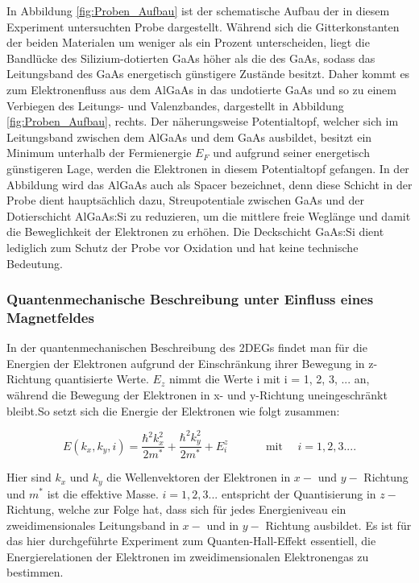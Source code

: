 In Abbildung \ref{fig:Proben_Aufbau} ist der schematische Aufbau der in diesem Experiment untersuchten Probe dargestellt. 
Während sich die Gitterkonstanten der beiden Materialen um weniger als ein Prozent unterscheiden, liegt die Bandlücke des  Silizium-dotierten GaAs  höher als die des GaAs, sodass das Leitungsband des GaAs energetisch günstigere Zustände besitzt. Daher kommt es zum Elektronenfluss aus dem AlGaAs in das undotierte GaAs und so zu einem Verbiegen des Leitungs- und Valenzbandes, dargestellt in Abbildung \ref{fig:Proben_Aufbau}, rechts.
Der näherungsweise Potentialtopf, welcher sich im Leitungsband zwischen dem AlGaAs und dem GaAs ausbildet, besitzt ein Minimum unterhalb der Fermienergie $E_F$ und aufgrund seiner energetisch günstigeren Lage, werden die Elektronen in diesem Potentialtopf gefangen. 
In der Abbildung wird das AlGaAs auch als Spacer bezeichnet, denn diese Schicht in der Probe dient hauptsächlich dazu, Streupotentiale zwischen GaAs und der Dotierschicht AlGaAs:Si zu reduzieren, um die mittlere freie Weglänge und damit die Beweglichkeit der Elektronen zu erhöhen. Die Deckschicht GaAs:Si dient lediglich zum Schutz der Probe vor Oxidation und hat keine technische Bedeutung.

\subsubsection{Quantenmechanische Beschreibung unter Einfluss eines Magnetfeldes}
In der quantenmechanischen Beschreibung des 2DEGs findet man für die Energien der Elektronen aufgrund der Einschränkung ihrer Bewegung in z-Richtung quantisierte Werte. $E_z$ nimmt die Werte i mit i = 1, 2, 3, ... an, während die Bewegung der Elektronen in x- und y-Richtung uneingeschränkt bleibt.So setzt sich die Energie der Elektronen wie folgt zusammen:

\begin{equation}
E(k_x,k_y,i)=\frac{\hbar^2k_x^2}{2m^*}+\frac{\hbar^2k_y^2}{2m^*}+E_i^z   \text{~~~~~~~~~ mit ~~~} i=1,2,3....
\label{eq:energie_2DEG}
\end{equation}

Hier sind $k_x$ und $k_y$ die Wellenvektoren der Elektronen in $x -$ und $y-$ Richtung und $m^*$ ist die effektive Masse. $i = 1,2,3...$  entspricht der Quantisierung in $z-$ Richtung, welche zur Folge hat, dass sich für jedes Energieniveau ein zweidimensionales  Leitungsband in $x-$ und in $y-$ Richtung ausbildet. 
Es ist für das hier durchgeführte Experiment zum Quanten-Hall-Effekt essentiell, die Energierelationen der Elektronen im zweidimensionalen Elektronengas zu bestimmen. 

